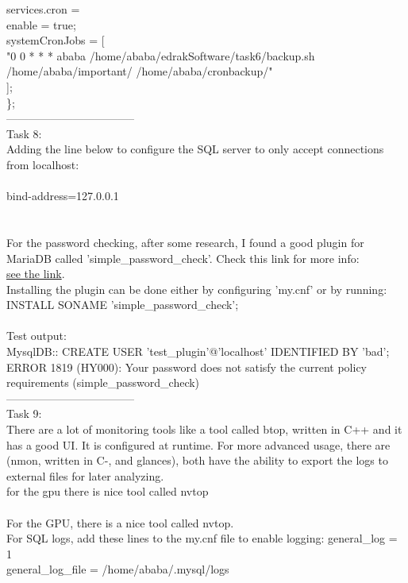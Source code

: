 \documentclass[a4paper,14pt]{extarticle}
\begin{document}
services.cron = {\\
    enable = true;\\
    systemCronJobs = [\\
      "0 0 * * *  ababa    /home/ababa/edrakSoftware/task6/backup.sh /home/ababa/important/ /home/ababa/cronbackup/"\\
   ];\\
\};\\
-----------------------------------\\
Task 8:\\
Adding the line below to configure the SQL server to only accept connections from localhost:\\
\\
bind-address=127.0.0.1\\
\\
\\
For the password checking, after some research, I found a good plugin for MariaDB called 'simple\_password\_check'. Check this link for more info:\\ 
\href{https://mariadb.com/kb/en/simple-password-check-plugin/}{see the link}.\\
Installing the plugin can be done either by configuring 'my.cnf' or by running:\\
INSTALL SONAME 'simple\_password\_check';\\
\\
Test output:\\
MysqlDB:: CREATE USER 'test\_plugin'@'localhost' IDENTIFIED BY 'bad';\\
ERROR 1819 (HY000): Your password does not satisfy the current policy requirements (simple\_password\_check)\\
-----------------------------------\\
Task 9:\\
There are a lot of monitoring tools like a tool called btop, written in C++ and it has a good UI. It is configured at runtime. For more advanced usage,
there are (nmon, written in C-, and glances), both have the ability to export the logs to external files for later analyzing.\\
for the gpu there is nice tool called nvtop \\
\\
For the GPU, there is a nice tool called nvtop.
\\
For SQL logs, add these lines to the my.cnf file to enable logging:
general\_log = 1\\
general\_log\_file = /home/ababa/.mysql/logs\\
}
\end{document}
